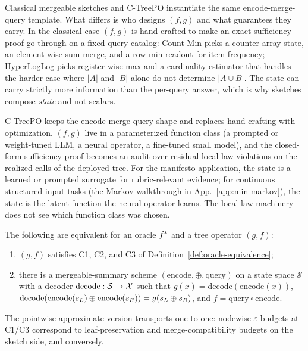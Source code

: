 Classical mergeable sketches and C-TreePO instantiate the same
encode-merge-query template. What differs is who designs $(f, g)$ and
what guarantees they carry. In the classical case $(f, g)$ is
hand-crafted to make an exact sufficiency proof go through on a fixed
query catalog: Count-Min picks a counter-array state, an element-wise
sum merge, and a row-min readout for item frequency; HyperLogLog
picks register-wise max and a cardinality estimator that handles the
harder case where $|A|$ and $|B|$ alone do not determine
$|A\cup B|$. The state can carry strictly more information than the
per-query answer, which is why sketches compose \emph{state} and not
scalars.

C-TreePO keeps the encode-merge-query shape and replaces hand-crafting
with optimization. $(f, g)$ live in a parameterized function class
(a prompted or weight-tuned LLM, a neural operator, a fine-tuned small
model), and the closed-form sufficiency proof becomes an audit over
residual local-law violations on the realized calls of the deployed
tree. For the manifesto application, the state is a learned or
prompted surrogate for rubric-relevant evidence; for continuous
structured-input tasks (the Markov walkthrough in
App.~\ref{app:min-markov}), the state is the latent function the
neural operator learns. The local-law machinery does not see which
function class was chosen.

\begin{theorem}\label{thm:sketch-equivalence}
The following are equivalent for an oracle $f^\ast$ and a tree
operator $(g, f)$:
\begin{enumerate}[leftmargin=1.5em]
  \item $(g, f)$ satisfies C1, C2, and C3 of
    Definition~\ref{def:oracle-equivalence};
  \item there is a mergeable-summary scheme
    $(\mathrm{encode}, \oplus, \mathrm{query})$ on a state space
    $\mathcal{S}$ with a decoder $\mathrm{decode}:\mathcal{S}\to\mathcal{X}$
    such that
    $g(x)=\mathrm{decode}(\mathrm{encode}(x))$,
    $\mathrm{decode}(\mathrm{encode}(s_L)\oplus\mathrm{encode}(s_R))=g(s_L\oplus s_R)$, and
    $f=\mathrm{query}\circ\mathrm{encode}$.
\end{enumerate}
The pointwise approximate version transports one-to-one: nodewise
$\varepsilon$-budgets at C1/C3 correspond to leaf-preservation and
merge-compatibility budgets on the sketch side, and conversely.
\end{theorem}

